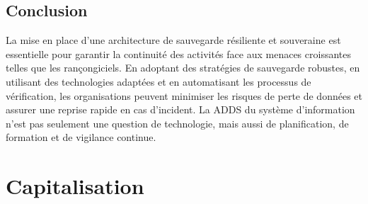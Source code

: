 \subsection*{Conclusion}
{}
La mise en place d'une architecture de sauvegarde résiliente et souveraine est essentielle pour garantir la continuité des activités face aux menaces croissantes telles que les rançongiciels. En adoptant des stratégies de sauvegarde robustes, en utilisant des technologies adaptées et en automatisant les processus de vérification, les organisations peuvent minimiser les risques de perte de données et assurer une reprise rapide en cas d'incident. La ADDS du système d'information n'est pas seulement une question de technologie, mais aussi de planification, de formation et de vigilance continue.

\newpage

\section*{Capitalisation}

